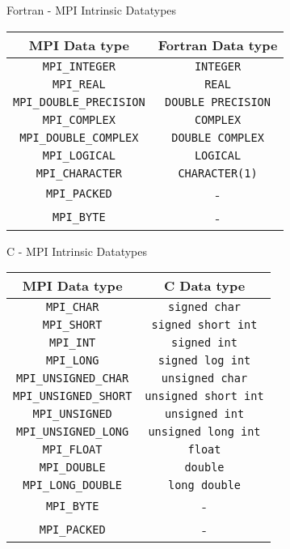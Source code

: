 \documentclass[aspectratio=43]{beamer}
\begin{document}
\begin{frame}[fragile]{Fortran - MPI Intrinsic Datatypes}
\begin{center}
\begin{tabular}{|c||c|}
    \hline
    \color{cscsblue}\textbf{MPI Data type} & \color{cscsbrown}\textbf{Fortran Data type} \\\hline\hline
    \verb+MPI_INTEGER+ & \verb+INTEGER+ \\\hline
    \verb+MPI_REAL+ & \verb+REAL+ \\\hline
    \verb+MPI_DOUBLE_PRECISION+ & \verb+DOUBLE PRECISION+ \\\hline
    \verb+MPI_COMPLEX+ & \verb+COMPLEX+ \\\hline
    \verb+MPI_DOUBLE_COMPLEX+ & \verb+DOUBLE COMPLEX+\\\hline
    \verb+MPI_LOGICAL+ & \verb+LOGICAL+ \\\hline
    \verb+MPI_CHARACTER+ & \verb+CHARACTER(1)+ \\\hline
    \verb+MPI_PACKED+ & -\\\hline
    \verb+MPI_BYTE+ & -\\\hline
\end{tabular}
\end{center}
\end{frame}

\begin{frame}[fragile]{C - MPI Intrinsic Datatypes}
\begin{center}
\begin{tabular}{|c||c|}
    \hline
    \color{cscsblue}\textbf{MPI Data type} & \color{cscsbrown}\textbf{C Data type} \\\hline\hline
    \verb+MPI_CHAR+ & \verb+signed char+\\\hline
    \verb+MPI_SHORT+ & \verb+signed short int+\\\hline
    \verb+MPI_INT+ & \verb+signed int+\\\hline
    \verb+MPI_LONG+ & \verb+signed log int+\\\hline
    \verb+MPI_UNSIGNED_CHAR+ & \verb+unsigned char+\\\hline
    \verb+MPI_UNSIGNED_SHORT+ & \verb+unsigned short int+\\\hline
    \verb+MPI_UNSIGNED+ & \verb+unsigned int+\\\hline
    \verb+MPI_UNSIGNED_LONG+ & \verb+unsigned long int+\\\hline
    \verb+MPI_FLOAT+ & \verb+float+\\\hline
    \verb+MPI_DOUBLE+ & \verb+double+\\\hline
    \verb+MPI_LONG_DOUBLE+ & \verb+long double+\\\hline
    \verb+MPI_BYTE+ & -\\\hline
    \verb+MPI_PACKED+ & -\\\hline
\end{tabular}
\end{center}
\end{frame}
\end{document}
